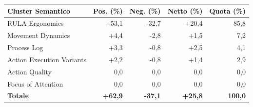 \begin{tabular*}{\linewidth}{@{}l@{\extracolsep{\fill}}rrrr@{}}
\toprule
\textbf{Cluster Semantico} & \textbf{Pos. (\%)} & \textbf{Neg. (\%)} & \textbf{Netto (\%)} & \textbf{Quota (\%)} \\
\midrule
RULA Ergonomics & +53{,}1 & -32{,}7 & +20{,}4 & 85{,}8 \\
Movement Dynamics & +4{,}4 & -2{,}8 & +1{,}5 & 7{,}2 \\
Process Log & +3{,}3 & -0{,}8 & +2{,}5 & 4{,}1 \\
Action Execution Variants & +2{,}2 & -0{,}8 & +1{,}4 & 2{,}9 \\
Action Quality & 0{,}0 & 0{,}0 & 0{,}0 & 0{,}0 \\
Focus of Attention & 0{,}0 & 0{,}0 & 0{,}0 & 0{,}0 \\
\midrule
\textbf{Totale} & \textbf{+62{,}9} & \textbf{-37{,}1} & \textbf{+25{,}8} & \textbf{100{,}0} \\
\bottomrule
\end{tabular*}
